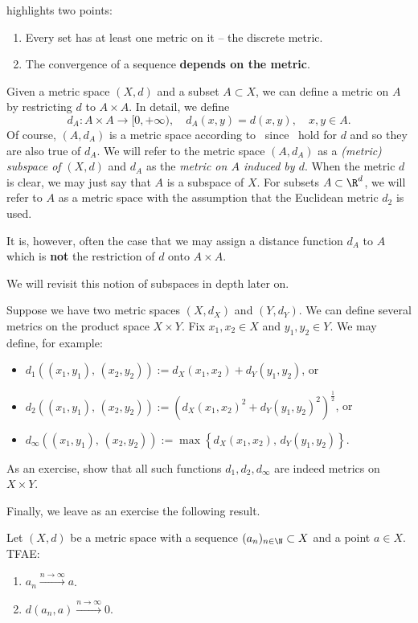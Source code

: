  highlights two points:
\begin{enumerate}
	\item Every set has at least one metric on it -- the discrete metric.
	\item The convergence of a sequence \textbf{depends on the metric}.
\end{enumerate}
\begin{eg}
	Given a metric space $(X,d)$ and a subset $A\subset X$, we can define a metric on $A$ by restricting $d$ to $A\times A$. In detail, we define
	\[
	d_A:A\times A \to [0,+\infty),\quad d_A(x,y) = d(x,y),\quad x,y\in A.
	\]
	Of course, $(A,d_A)$ is a metric space according to~ since~ hold for $d$ and so they are also true of $d_A$. We will refer to the metric space $(A,d_A)$ as a \textit{(metric) subspace of }$(X,d)$ and $d_A$ as the \textit{metric on $A$ induced by $d$}. When the metric $d$ is clear, we may just say that $A$ is a subspace of $X$. For subsets $A\subset \R^d$, we will refer to $A$ as a metric space with the assumption that the Euclidean metric $d_2$ is used.
	
	It is, however, often the case that we may assign a distance function $d_A$ to $A$ which is \textbf{not} the restriction of $d$ onto $A\times A$.
	
	We will revisit this notion of subspaces in depth later on.
\end{eg}
\begin{eg}
	Suppose we have two metric spaces $(X,d_X)$ and $(Y,d_Y)$. We can define several metrics on the product space $X\times Y$. Fix $x_1,x_2\in X$ and $y_1,y_2\in Y$. We may define, for example:
	\begin{itemize}
		\item $d_1((x_1,y_1),\,(x_2,y_2)):= d_X(x_1,x_2) + d_Y(y_1,y_2)$, or
		\item $d_2((x_1,y_1),\,(x_2,y_2)):= \left(d_X(x_1,x_2)^2 + d_Y(y_1,y_2)^2\right)^\frac{1}{2}$, or
		\item $d_\infty((x_1,y_1),\,(x_2,y_2)):= \max\left\{d_X(x_1,x_2),\,d_Y(y_1,y_2)\right\}$.
	\end{itemize}
	As an exercise, show that all such functions $d_1,d_2,d_\infty$ are indeed metrics on $X\times Y$.
\end{eg}
Finally, we leave as an exercise the following result.
\begin{ex}
\label{ex:cvg_metric}
Let $(X,d)$ be a metric space with a sequence $(a_n)_{n\in\N}\subset X$ and a point $a\in X$. TFAE:
\begin{enumerate}
	\item $a_n\overset{n\to \infty}{\to} a$.
	\item $d(a_n,a)\overset{n\to \infty}{\to}0$.
\end{enumerate}
\end{ex}
